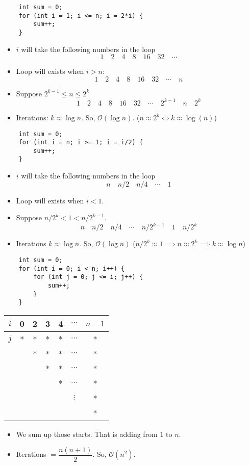 \documentclass[12pt, a4paper]{article}
\def\O{\mathcal{O}}
\begin{document}
\begin{lstlisting}
	int sum = 0;
	for (int i = 1; i <= n; i = 2*i) {
		sum++;
	}
\end{lstlisting}
\begin{itemize}
		\item $i$ will take the following numbers in the loop \[1\quad2\quad4\quad8\quad16\quad32\quad\cdots\]
		\item Loop will exists when $i>n$: \[1\quad2\quad4\quad8\quad16\quad32\quad\cdots\quad n\]
		\item Suppose $2^{k-1}\leq n\leq 2^k$ \[1\quad2\quad4\quad8\quad16\quad32\quad\cdots\quad2^{k-1}\quad n\quad2^{k}\]
		\item Iterations: $k\approx\log{n}$. So, $\O(\log{n})$. ($n\approx2^{k}\Longleftrightarrow k\approx\log(n)$)
\end{itemize}
\begin{lstlisting}
	int sum = 0;
	for (int i = n; i >= 1; i = i/2) {
		sum++;
	}
\end{lstlisting}
\begin{itemize}
	\item $i$ will take the following numbers in the loop
	\[n\quad n/2\quad n/4\quad\cdots\quad1\]
	\item Loop will exists when $i<1$.
	\item Suppose $n/2^{k}<1<n/2^{k-1}$. \[n\quad n/2\quad n/4\quad\cdots\quad n/2^{k-1}\quad1\quad n/2^{k}\]
	\item Iterations $k\approx\log{n}$. So, $\O(\log{n})$ ($n/2^k\approx1\implies n\approx2^k\implies k\approx\log{n}$)
\end{itemize}
\begin{lstlisting}
	int sum = 0;
	for (int i = 0; i < n; i++) {
		for (int j = 0; j <= i; j++) {
			sum++;
		}
	}
\end{lstlisting}
\begin{center}\begin{tabular}{c|c|c|c|c|c|c}
	$i$&0&2&3&4&$\cdots$&$n-1$\\\hline
	$j$&*&*&*&*&$\cdots$&*\\
	&&*&*&*&$\cdots$&*\\
	&&&*&*&$\cdots$&*\\
	&&&&*&$\cdots$&*\\
	&&&&&$\vdots$&*\\
	&&&&&&*
\end{tabular}\end{center}
\begin{itemize}
	\item We sum up those starts. That is adding from $1$ to $n$.
	\item Iterations $=\dfrac{n(n+1)}{2}$. So, $\O(n^2)$.
\end{itemize}
\end{document}
